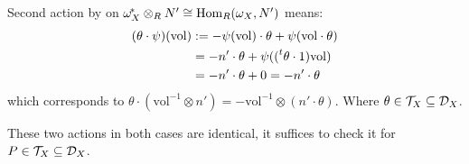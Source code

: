 \begin{remark}
    Second action by \cite[Proposition~1.2.9]{hotta2008d} on $\omega_X^{\!*} \otimes_R N' \cong \operatorname{Hom}_R(\omega_X, N')$ means:
    \begin{align*}
        (\theta \cdot \psi)(\mathrm{vol}) & := -\psi(\mathrm{vol})\cdot \theta + \psi(\mathrm{vol} \cdot \theta)     \\
                                          & = -n' \cdot \theta + \psi((\prescript{t}{}{\theta} \cdot 1)\mathrm{vol}) \\
                                          & = -n' \cdot \theta + 0 = -n' \cdot \theta
    \end{align*}
    which corresponds to $\theta \cdot (\mathrm{vol}^{-1} \otimes n') = -\mathrm{vol}^{-1} \otimes (n' \cdot \theta)$.
    Where $\theta \in \mathcal{T}_X \subseteq \mathcal{D}_X$.

    These two actions in both cases are identical, it suffices to check it for $P \in \mathcal{T}_X \subseteq \mathcal{D}_X$.

\end{remark}



